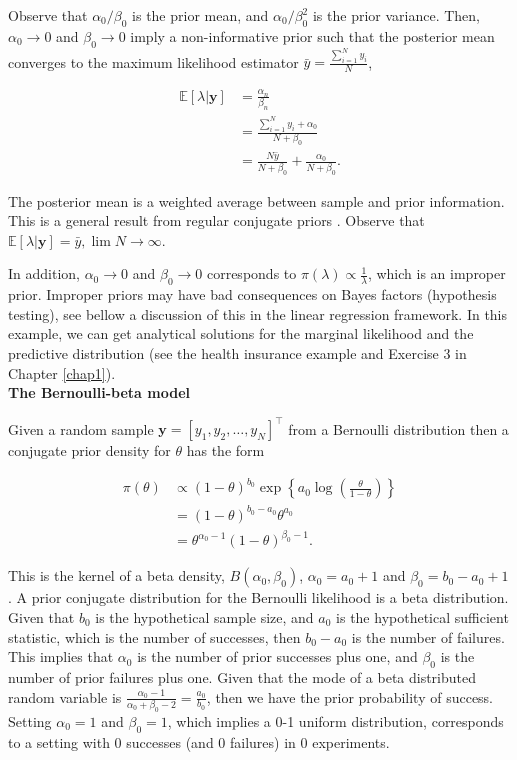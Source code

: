 \begin{enumerate}
Observe that $\alpha_0/\beta_0$ is the prior mean, and $\alpha_0/\beta_0^2$ is the prior variance. Then, $\alpha_0\rightarrow 0$ and $\beta_0\rightarrow 0$ imply a non-informative prior such that the posterior mean converges to the maximum likelihood estimator $\bar{y}=\frac{\sum_{i=1}^N y_i}{N}$,

\begin{align}
	\mathbb{E}\left[\lambda|\mathbf{y}\right]&=\frac{\alpha_n}{\beta_n}\nonumber\\
	&=\frac{\sum_{i=1}^Ny_i+\alpha_0}{N+\beta_0}\nonumber\\
	&=\frac{N\bar{y}}{N+\beta_0}+\frac{\alpha_0}{N+\beta_0}.\nonumber
\end{align}

The posterior mean is a weighted average between sample and prior information. This is a general result from regular conjugate priors \cite{diaconis1979conjugate}. Observe that $\mathbb{E}\left[\lambda|\mathbf{y}\right]=\bar{y}, \lim N\rightarrow\infty$. 

In addition, $\alpha_0\rightarrow 0$ and $\beta_0\rightarrow 0$ corresponds to $\pi(\lambda)\propto \frac{1}{\lambda}$, which is an improper prior. Improper priors may have bad consequences on Bayes factors (hypothesis testing), see bellow a discussion of this in the linear regression framework. In this example, we can get analytical solutions for the marginal likelihood and the predictive distribution (see the health insurance example and Exercise 3 in Chapter \ref{chap1}).\\ 

\textbf{The Bernoulli-beta model}

Given a random sample $\mathbf{y}=[y_1,y_2,\dots,y_N]^{\top}$ from a Bernoulli distribution then a conjugate prior density for $\theta$ has the form 

\begin{align}
	\pi(\theta)&\propto (1-\theta)^{b_0} \exp\left\{a_0\log\left(\frac{\theta}{1-\theta}\right)\right\}\nonumber\\
	& = (1-\theta)^{b_0-a_0}\theta^{a_0}\nonumber\\
	& = \theta^{\alpha_0-1}(1-\theta)^{\beta_0-1}.\nonumber
\end{align}

This is the kernel of a beta density, $B(\alpha_0,\beta_0)$, $\alpha_0=a_0+1$ and $\beta_0=b_0-a_0+1$. A prior conjugate distribution for the Bernoulli likelihood is a beta distribution. Given that $b_0$ is the hypothetical sample size, and $a_0$ is the hypothetical sufficient statistic, which is the number of successes, then $b_0-a_0$ is the number of failures. This implies that $\alpha_0$ is the number of prior successes plus one, and $\beta_0$ is the number of prior failures plus one. Given that the mode of a beta distributed random variable is $\frac{\alpha_0-1}{\alpha_0+\beta_0-2}=\frac{a_0}{b_0}$, then we have the prior probability of success. Setting $\alpha_0=1$ and $\beta_0=1$, which implies a 0-1 uniform distribution, corresponds to a setting with 0 successes (and 0 failures) in 0 experiments.   


\end{enumerate}
